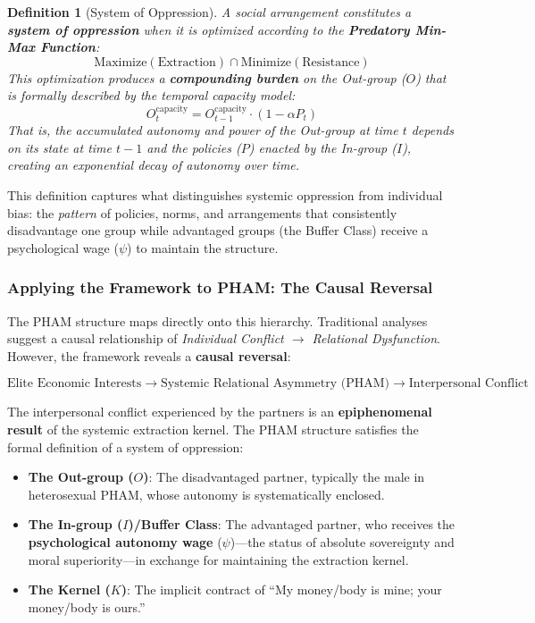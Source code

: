 \documentclass[12pt, letterpaper]{article}
\newtheorem{definition}{Definition}[section]
\begin{document}
\begin{definition}[System of Oppression]
A social arrangement constitutes a \textbf{system of oppression} when it is optimized according to the \textbf{Predatory Min-Max Function}:
\[
\text{Maximize}(\text{Extraction}) \cap \text{Minimize}(\text{Resistance})
\]
This optimization produces a \textbf{compounding burden} on the Out-group ($O$) that is formally described by the temporal capacity model:
\[
O_t^{\text{capacity}} = O_{t-1}^{\text{capacity}} \cdot (1 - \alpha P_t)
\]
That is, the accumulated autonomy and power of the Out-group at time $t$ depends on its state at time $t-1$ and the policies ($P$) enacted by the In-group ($I$), creating an exponential decay of autonomy over time.
\end{definition}

This definition captures what distinguishes systemic oppression from individual bias: the \textit{pattern} of policies, norms, and arrangements that consistently disadvantage one group while advantaged groups (the Buffer Class) receive a psychological wage ($\psi$) to maintain the structure.

\subsubsection{Applying the Framework to PHAM: The Causal Reversal}

The PHAM structure maps directly onto this hierarchy. Traditional analyses suggest a causal relationship of \textit{Individual Conflict $\rightarrow$ Relational Dysfunction}. However, the framework reveals a \textbf{causal reversal}:

\[
\text{Elite Economic Interests} \rightarrow \text{Systemic Relational Asymmetry (PHAM)} \rightarrow \text{Interpersonal Conflict}
\]

The interpersonal conflict experienced by the partners is an \textbf{epiphenomenal result} of the systemic extraction kernel. The PHAM structure satisfies the formal definition of a system of oppression:

\begin{itemize}
    \item \textbf{The Out-group ($O$)}: The disadvantaged partner, typically the male in heterosexual PHAM, whose autonomy is systematically enclosed.
    \item \textbf{The In-group ($I$)/Buffer Class}: The advantaged partner, who receives the \textbf{psychological autonomy wage} ($\psi$)---the status of absolute sovereignty and moral superiority---in exchange for maintaining the extraction kernel.
    \item \textbf{The Kernel ($K$)}: The implicit contract of ``My money/body is mine; your money/body is ours.''
\end{itemize}
\end{document}
